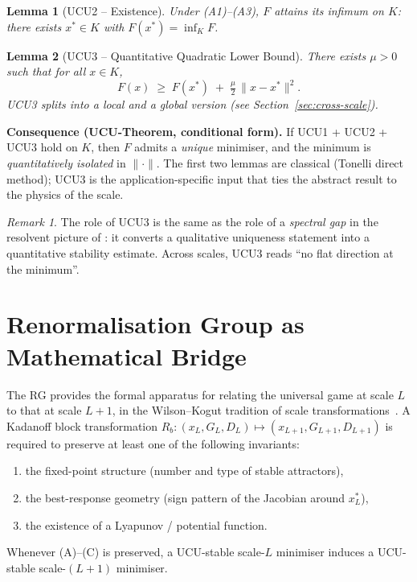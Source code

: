 \documentclass[11pt,a4paper]{article}
\newtheorem{lemma}{Lemma}
\theoremstyle{remark}
\newtheorem*{remark}{Remark}
\begin{document}
\begin{lemma}[UCU2 -- Existence]
\label{lem:ucu2}
Under (A1)--(A3), $F$ attains its infimum on $K$:
there exists $x^* \in K$ with $F(x^*) = \inf_K F$.
\end{lemma}

\begin{lemma}[UCU3 -- Quantitative Quadratic Lower Bound]
\label{lem:ucu3}
There exists $\mu > 0$ such that for all $x \in K$,
\[
F(x) \;\ge\; F(x^*) \;+\; \tfrac{\mu}{2}\,\|x - x^*\|^2.
\]
UCU3 splits into a \emph{local} and a \emph{global} version
(see Section~\ref{sec:cross-scale}).
\end{lemma}

\noindent\textbf{Consequence (UCU-Theorem, conditional form).}
If UCU1 + UCU2 + UCU3 hold on $K$, then $F$ admits a \emph{unique}
minimiser, and the minimum is \emph{quantitatively isolated} in
$\|\cdot\|$. The first two lemmas are classical (Tonelli direct
method); UCU3 is the application-specific input that ties the
abstract result to the physics of the scale.

\begin{remark}
The role of UCU3 is the same as the role of a \emph{spectral gap}
in the resolvent picture of \cite{GeigerZookeeper-2026}: it converts a
qualitative uniqueness statement into a quantitative stability
estimate. Across scales, UCU3 reads ``no flat direction at the
minimum''.
\end{remark}

\section{Renormalisation Group as Mathematical Bridge}
\label{sec:rg-bridge}

The RG provides the formal apparatus for relating the universal game
at scale $L$ to that at scale $L+1$, in the Wilson--Kogut tradition
of scale transformations~\cite{Wilson1974}. A Kadanoff block
transformation $R_b : (x_L, G_L, D_L) \mapsto (x_{L+1}, G_{L+1}, D_{L+1})$
is required to preserve at least one of the following invariants:
\begin{enumerate}[label=(\Alph*),leftmargin=2em]
\item the fixed-point structure (number and type of stable attractors),
\item the best-response geometry (sign pattern of the Jacobian
      around $x_L^*$),
\item the existence of a Lyapunov / potential function.
\end{enumerate}
Whenever (A)--(C) is preserved, a UCU-stable scale-$L$ minimiser
induces a UCU-stable scale-$(L{+}1)$ minimiser.
\end{document}

